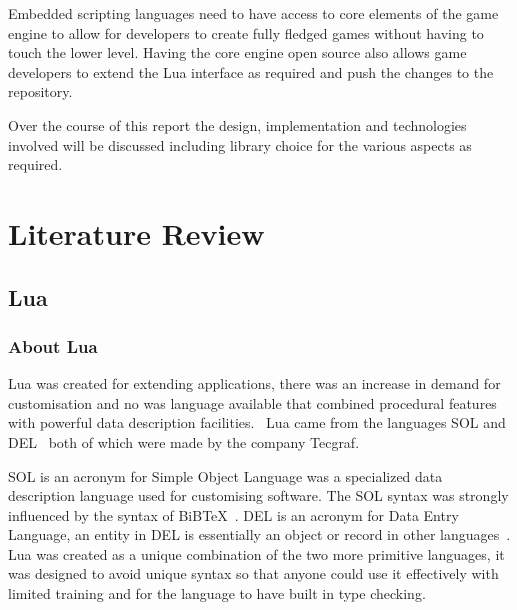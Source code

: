 \documentclass[11pt,a4paper,titlepage]{report}
\begin{document}
	Embedded scripting languages need to have access to core elements of the game engine to allow for developers to create fully fledged games without having to touch the lower level. Having the core engine open source also allows game developers to extend the Lua interface as required and push the changes to the repository.

	Over the course of this report the design, implementation and technologies involved will be discussed including library choice for the various aspects as required.
	
\newpage










	
\chapter{Literature Review}


\section{Lua}
\subsection{About Lua}
	Lua was created for extending applications, there was an increase in demand for customisation and no was language available that combined procedural features with powerful data description facilities.~\cite{Ierusalimschy02software} Lua came from the languages SOL and DEL~\cite{Ierusalimschy01theevolution} both of which were made by the company Tecgraf.
	
	SOL is an acronym for Simple Object Language was a specialized data description language used for customising software. The SOL syntax was strongly influenced by the syntax of BiBTeX~\cite{Lamport:1989:LDP:63364}. DEL is an acronym for Data Entry Language, an entity in DEL is essentially an object or record in other languages~\cite{Ierusalimschy01theevolution}. Lua was created as a unique combination of the two more primitive languages, it was designed to avoid unique syntax so that anyone could use it effectively with limited training and for the language to have built in type checking.
	
\end{document}
